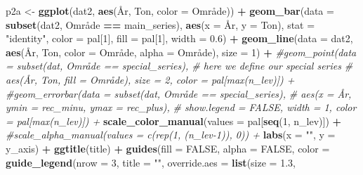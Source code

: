 \documentclass[]{article}
\newenvironment{Shaded}{\begin{snugshade}}{\end{snugshade}}
\newcommand{\KeywordTok}[1]{\textcolor[rgb]{0.13,0.29,0.53}{\textbf{#1}}}
\newcommand{\DataTypeTok}[1]{\textcolor[rgb]{0.13,0.29,0.53}{#1}}
\newcommand{\DecValTok}[1]{\textcolor[rgb]{0.00,0.00,0.81}{#1}}
\newcommand{\FloatTok}[1]{\textcolor[rgb]{0.00,0.00,0.81}{#1}}
\newcommand{\StringTok}[1]{\textcolor[rgb]{0.31,0.60,0.02}{#1}}
\newcommand{\CommentTok}[1]{\textcolor[rgb]{0.56,0.35,0.01}{\textit{#1}}}
\newcommand{\OtherTok}[1]{\textcolor[rgb]{0.56,0.35,0.01}{#1}}
\newcommand{\OperatorTok}[1]{\textcolor[rgb]{0.81,0.36,0.00}{\textbf{#1}}}
\newcommand{\NormalTok}[1]{#1}
\begin{document}
\begin{Shaded}
\begin{Highlighting}[]
\NormalTok{p2a <-}\StringTok{ }\KeywordTok{ggplot}\NormalTok{(dat2, }\KeywordTok{aes}\NormalTok{(År, Ton, }\DataTypeTok{color =}\NormalTok{ Område)) }\OperatorTok{+}
\StringTok{  }\KeywordTok{geom_bar}\NormalTok{(}\DataTypeTok{data =} \KeywordTok{subset}\NormalTok{(dat2, Område }\OperatorTok{==}\StringTok{ }\NormalTok{main_series), }
           \KeywordTok{aes}\NormalTok{(}\DataTypeTok{x =}\NormalTok{ År, }\DataTypeTok{y =}\NormalTok{ Ton), }\DataTypeTok{stat =} \StringTok{"identity"}\NormalTok{, }\DataTypeTok{color =}\NormalTok{ pal[}\DecValTok{1}\NormalTok{], }\DataTypeTok{fill =}\NormalTok{ pal[}\DecValTok{1}\NormalTok{], }
           \DataTypeTok{width =} \FloatTok{0.6}\NormalTok{) }\OperatorTok{+}
\StringTok{  }\KeywordTok{geom_line}\NormalTok{(}\DataTypeTok{data =}\NormalTok{ dat2, }\KeywordTok{aes}\NormalTok{(År, Ton, }\DataTypeTok{color =}\NormalTok{ Område, }\DataTypeTok{alpha =}\NormalTok{ Område), }
            \DataTypeTok{size =} \DecValTok{1}\NormalTok{) }\OperatorTok{+}\StringTok{ }
\StringTok{  }\CommentTok{#geom_point(data = subset(dat, Område == special_series), # here we define our special series}
\StringTok{  }\CommentTok{#           aes(År, Ton, fill = Område), size = 2, color = pal[max(n_lev)]) + }
\StringTok{  }\CommentTok{#geom_errorbar(data = subset(dat, Område == special_series), }
\StringTok{  }\CommentTok{#              aes(x = År, ymin = rec_minu, ymax = rec_plus), }
\StringTok{  }\CommentTok{#              show.legend = FALSE, width  = 1, color = pal[max(n_lev)]) +}
\StringTok{  }\KeywordTok{scale_color_manual}\NormalTok{(}\DataTypeTok{values =}\NormalTok{ pal[}\KeywordTok{seq}\NormalTok{(}\DecValTok{1}\NormalTok{, n_lev)]) }\OperatorTok{+}
\StringTok{  }\CommentTok{#scale_alpha_manual(values = c(rep(1, (n_lev-1)), 0)) + }
\StringTok{  }\KeywordTok{labs}\NormalTok{(}\DataTypeTok{x =} \StringTok{""}\NormalTok{, }\DataTypeTok{y =}\NormalTok{ y_axis) }\OperatorTok{+}
\StringTok{  }\KeywordTok{ggtitle}\NormalTok{(title) }\OperatorTok{+}
\StringTok{  }\KeywordTok{guides}\NormalTok{(}\DataTypeTok{fill  =} \OtherTok{FALSE}\NormalTok{,}
         \DataTypeTok{alpha =} \OtherTok{FALSE}\NormalTok{,}
         \DataTypeTok{color =} \KeywordTok{guide_legend}\NormalTok{(}\DataTypeTok{nrow =} \DecValTok{3}\NormalTok{, }
                              \DataTypeTok{title =} \StringTok{""}\NormalTok{,}
                              \DataTypeTok{override.aes =} \KeywordTok{list}\NormalTok{(}\DataTypeTok{size =} \FloatTok{1.3}\NormalTok{, }

\end{Highlighting}
\end{Shaded}
\end{document}

